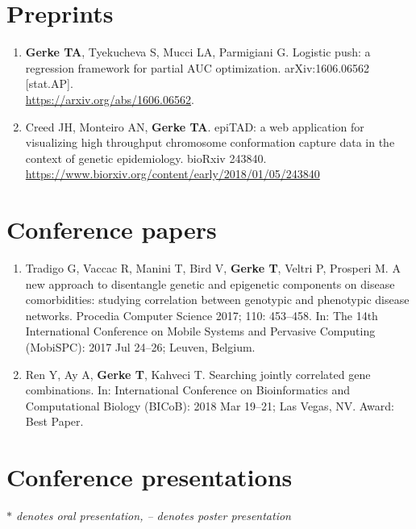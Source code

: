\documentclass[11pt, a4paper]{article} %
\begin{document}
\section*{Preprints}
\begin{enumerate}[leftmargin=*]
\item{} {\bf Gerke TA}, Tyekucheva S, Mucci LA, Parmigiani G. Logistic push: a regression framework for partial AUC optimization. arXiv:1606.06562 [stat.AP].\\\href{https://arxiv.org/abs/1606.06562}{https://arxiv.org/abs/1606.06562}.

\item{} Creed JH, Monteiro AN, {\bf Gerke TA}. epiTAD: a web application for visualizing high throughput chromosome conformation capture data in the context of genetic epidemiology. bioRxiv 243840. \href{https://www.biorxiv.org/content/early/2018/01/05/243840}{https://www.biorxiv.org/content/early/2018/01/05/243840}
\end{enumerate}

\section*{Conference papers}
\begin{enumerate}[leftmargin=*]
\item{} Tradigo G, Vaccac R, Manini T, Bird V, {\bf Gerke T}, Veltri P, Prosperi M. A new approach to disentangle genetic and epigenetic components on disease comorbidities: studying correlation between genotypic and phenotypic disease networks. Procedia Computer Science 2017; 110: 453--458. In: The 14th International Conference on Mobile Systems and Pervasive Computing (MobiSPC): 2017 Jul 24--26; Leuven, Belgium.

\item{} Ren Y, Ay A, {\bf Gerke T}, Kahveci T. Searching jointly correlated gene combinations. In: International Conference on Bioinformatics and Computational Biology (BICoB): 2018 Mar 19--21; Las Vegas, NV. Award: Best Paper. 
\end{enumerate}

\section*{Conference presentations}
\vspace{-.3cm}
{\footnotesize\emph{$*$ denotes oral presentation, -- denotes poster presentation}}\\
\end{document}
